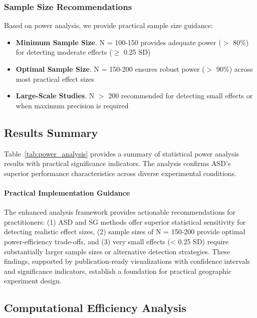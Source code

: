 \documentclass[final,3p,fleqn, 10pt]{elsarticle}
\begin{document}
\subsubsection{Sample Size Recommendations}

Based on power analysis, we provide practical sample size guidance:

\begin{itemize}
    \item \textbf{Minimum Sample Size}. N = 100-150 provides adequate power ($>$ 80\%) for detecting moderate effects ($\geq$ 0.25 SD)
    \item \textbf{Optimal Sample Size}. N = 150-200 ensures robust power ($>$ 90\%) across most practical effect sizes
    \item \textbf{Large-Scale Studies}. N $>$ 200 recommended for detecting small effects or when maximum precision is required
\end{itemize}

\subsection{Results Summary}
\label{sec:comprehensive_results}

Table~\ref{tab:power_analysis} provides a summary of statistical power analysis results with practical significance indicators. The analysis confirms ASD's superior performance characteristics across diverse experimental conditions.



\paragraph{Practical Implementation Guidance} The enhanced analysis framework provides actionable recommendations for practitioners: (1) ASD and SG methods offer superior statistical sensitivity for detecting realistic effect sizes, (2) sample sizes of N = 150-200 provide optimal power-efficiency trade-offs, and (3) very small effects (< 0.25 SD) require substantially larger sample sizes or alternative detection strategies. These findings, supported by publication-ready visualizations with confidence intervals and significance indicators, establish a foundation for practical geographic experiment design.

\subsection{Computational Efficiency Analysis}
\label{sec:computational_efficiency}
\end{document}
